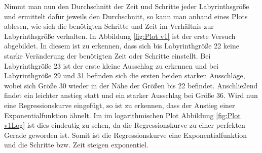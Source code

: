 \documentclass[11pt, a4paper]{article}
\begin{document}
Nimmt man nun den Durchschnitt der Zeit und Schritte jeder Labyrinthsgröße und ermittelt dafür jeweils den Durchschnitt, so kann man anhand eines Plots ablesen, wie sich die benötigten Schritte und Zeit im Verhältnis zur Labyrinthsgröße verhalten.  
In Abbildung \ref{fig:Plot v1} ist der erste Versuch abgebildet. In diesem ist zu erkennen, dass sich bis Labyrinthgröße 22 keine starke Veränderung der benötigten Zeit oder Schritte einstellt. Bei Labyrinthgröße 23 ist der erste kleine Ausschlag zu erkennen und bei Labyrinthgröße 29 und 31 befinden sich die ersten beiden starken Ausschläge, wobei sich Größe 30 wieder in der Nähe der Größen bis 22 befindet. Anschließend findet ein leichter anstieg statt und ein starker Ausschlag bei Größe 36. 
Wird nun eine Regressionskurve eingefügt, so ist zu erkennen, dass der Anstieg einer Exponentialfunktion ähnelt. Im im logarithmischen Plot Abbildung \ref{fig:Plot v1Log} ist dies eindeutig zu sehen, da die Regressionskurve zu einer perfekten Gerade geworden ist. Somit ist die Regressionskurve eine Exponentialfunktion und die Schritte bzw. Zeit steigen exponentiel.
\end{document}
